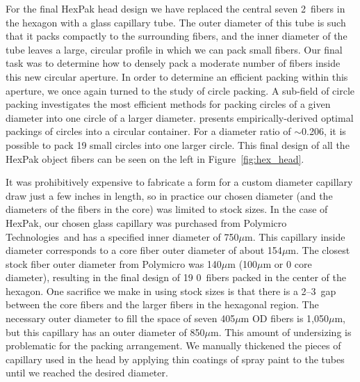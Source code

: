 For the final HexPak head design we have replaced the central seven
2\ fibers in the hexagon with a glass capillary tube.  The outer
diameter of this tube is such that it packs compactly to the surrounding
fibers, and the inner diameter of the tube leaves a large, circular profile in
which we can pack small fibers.  Our final task was to determine how to
densely pack a moderate number of fibers inside this new circular aperture.
In order to determine an efficient packing within this aperture, we once again
turned to the study of circle packing.  A sub-field of circle packing
investigates the most efficient methods for packing circles of a given
diameter into one circle of a larger diameter. \citet{Kravitz67}
presents empirically-derived optimal packings of circles into a circular
container.  For a diameter ratio of $\sim$0.206, it is possible to pack 19
small circles into one larger circle.  This final design of all the HexPak
object fibers can be seen on the left in Figure~\ref{fig:hex_head}.


It was prohibitively expensive to fabricate a form for a custom diameter
capillary draw just a few inches in length, so in practice our chosen diameter
(and the diameters of the fibers in the core) was limited to stock sizes.  In
the case of HexPak, our chosen glass capillary was purchased from Polymicro
Technologies\footnotemark\ and has a specified inner diameter of 750$\mu$m.
 This capillary inside diameter corresponds to
a core fiber outer diameter of about 154$\mu$m.  The closest stock fiber outer
diameter from Polymicro was 140$\mu$m (100$\mu$m or 0 core diameter),
resulting in the final design of 19 0\ fibers packed in the center of
the hexagon.  One sacrifice we make in using stock sizes is that there is a
2--3\arcsec\ gap between the core fibers and the larger fibers in the
hexagonal region.  The necessary outer diameter to fill the space of seven
405$\mu$m OD fibers is 1,050$\mu$m, but this capillary has an outer diameter
of 850$\mu$m.  This amount of undersizing is problematic for the packing
arrangement.  We manually thickened the pieces of capillary used in the head
by applying thin coatings of spray paint to the tubes until we reached the
desired diameter.


